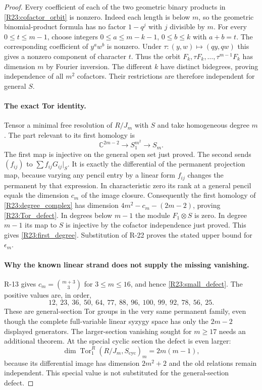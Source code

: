 \begin{proof}
Every coefficient of each of the two geometric binary products in
\eqref{R23:cofactor_orbit} is nonzero. Indeed each length is below
$m$, so the geometric binomial-product formula has no factor
$1-q^j$ with $j$ divisible by $m$. For every
$0\leq t\leq m-1$, choose integers
$0\leq a\leq m-k-1$, $0\leq b\leq k$ with $a+b=t$.
The corresponding coefficient of $y^aw^b$ is nonzero. Under
$\tau:(y,w)\mapsto(qy,qw)$ this gives a nonzero component of
character $t$. Thus the orbit
$F_k,\tau F_k,\ldots,\tau^{m-1}F_k$ has dimension $m$ by Fourier
inversion. The different $k$ have distinct bidegrees, proving
independence of all $m^2$ cofactors. Their restrictions are therefore
independent for general $S$.

\paragraph{The exact Tor identity.}
Tensor a minimal free resolution of $R/J_m$ with $S$ and take
homogeneous degree $m$. The part relevant to its first homology is
\begin{equation}\label{R23:degree_complex}
 \mathbb C^{2m-2}\longrightarrow
                 S_1^{m^2}\longrightarrow S_m.
\end{equation}
The first map is injective on the general open set just proved.
The second sends $(f_{ij})$ to
$\sum f_{ij}G_{ij}|_S$. It is exactly the differential of the
permanent projection map, because varying any pencil entry by a
linear form $f_{ij}$ changes the permanent by that expression.
In characteristic zero its rank at a general pencil equals the
dimension $c_m$ of the image closure. Consequently the first
homology of \eqref{R23:degree_complex} has dimension
$4m^2-c_m-(2m-2)$, proving \eqref{R23:Tor_defect}.
In degrees below $m-1$ the module $F_1\otimes S$ is zero. In degree
$m-1$ its map to $S$ is injective by the cofactor independence just
proved. This gives \eqref{R23:first_degree}.
Substitution of R-22 proves the stated upper bound for $\epsilon_m$.

\paragraph{Why the known linear strand does not supply the missing vanishing.}
R-13 gives $c_m=\binom{m+3}{3}$ for $3\leq m\leq16$,
and hence \eqref{R23:small_defect}. The positive values are, in order,
\[
 12,\ 23,\ 36,\ 50,\ 64,\ 77,\ 88,\ 96,\ 100,\ 99,\ 92,\ 78,\ 56,\ 25.
\]
These are general-section Tor groups in the very same permanent
family, even though the complete full-variable linear syzygy space
has only the $2m-2$ displayed generators. The larger-section
vanishing sought for $m\geq17$ needs an additional theorem.
At the special cyclic section the defect is even larger:
\[
 \dim\operatorname{Tor}_1^R(R/J_m,S_{\mathrm{cyc}})_m
 =2m(m-1),
\]
because its differential image has dimension $2m^2+2$ and the old
relations remain independent. This special value is not substituted
for the general-section defect.


\end{proof}
